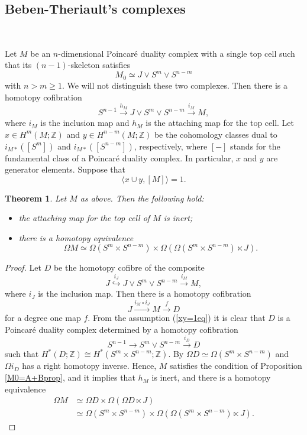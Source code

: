 \documentclass[a4]{amsart}
\newtheorem{theorem}{Theorem}[section]
\theoremstyle{definition}
\begin{document}
\begin{sloppypar}
\subsection{Beben-Theriault's complexes}
\label{subsec: BT}

$\, $


Let $M$ be an $n$-dimensional Poincar\'{e} duality complex with a single top cell such that its $(n-1)$-skeleton satisfies
\[
M_0\simeq J\vee S^m\vee S^{n-m}
\]  
with $n>m\geq 1$. We will not distinguish these two complexes. 
Then there is a homotopy cofibration
\[
S^{n-1}\stackrel{h_M}{\longrightarrow} J\vee S^m\vee S^{n-m}\stackrel{i_M}{\longrightarrow}M,
\]
where $i_M$ is the inclusion map and $h_M$ is the attaching map for the top cell. Let $x\in H^m(M;\mathbb{Z})$ and $y\in H^{n-m}(M;\mathbb{Z})$ be the cohomology classes dual to $i_{M\ast}([S^m])$ and $i_{M\ast}([S^{n-m}])$, respectively, where $[-]$ stands for the fundamental class of a Poincar\'{e} duality complex. In particular, $x$ and $y$ are generator elements. Suppose that 
\begin{equation}\label{xy=1eq}
\langle x\cup y, [M]\rangle =1.
\end{equation}

\begin{theorem}\label{exJthm}
Let $M$ as above. Then the following hold:
\begin{itemize}
\item
the attaching map for the top cell of $M$ is inert;
\item 
there is a homotopy equivalence
\[
\Omega M\simeq \Omega (S^m\times S^{n-m})\times \Omega(\Omega (S^m\times S^{n-m})\ltimes J).
\]
\end{itemize}
\end{theorem}
\begin{proof}
Let $D$ be the homotopy cofibre of the composite 
\[J\stackrel{i_J}{\hookrightarrow}J\vee S^m\vee S^{n-m}\stackrel{i_M}{\longrightarrow}M,
\]
where $i_J$ is the inclusion map. 
Then there is a homotopy cofibration 
\[
J\stackrel{i_M\circ i_J}{\longrightarrow} M\stackrel{f}{\longrightarrow} D
\]
for a degree one map $f$. From the assumption (\ref{xy=1eq}) it is clear that $D$ is a Poincar\'{e} duality complex determined by a homotopy cofibration 
\[
S^{n-1}\stackrel{}{\longrightarrow} S^{m}\vee S^{n-m}\stackrel{i_D}{\longrightarrow} D
\]
such that $H^\ast(D;\mathbb{Z})\cong H^\ast(S^m\times S^{n-m};\mathbb{Z})$. By \cite[Lemma 2.3]{BT14} $\Omega D\simeq \Omega (S^m\times S^{n-m})$ and $\Omega i_D$ has a right homotopy inverse.
Hence, $M$ satisfies the condition of Proposition \ref{M0=A+Bprop}, and it implies that $h_M$ is inert, and there is a homotopy equivalence
\[
\begin{split}
\Omega M 
&\simeq  \Omega D\times \Omega(\Omega D\ltimes J)\\
&\simeq\Omega (S^m\times S^{n-m})\times \Omega(\Omega (S^m\times S^{n-m})\ltimes J).
\end{split}
\]
\end{proof}


\end{sloppypar}
\end{document}
